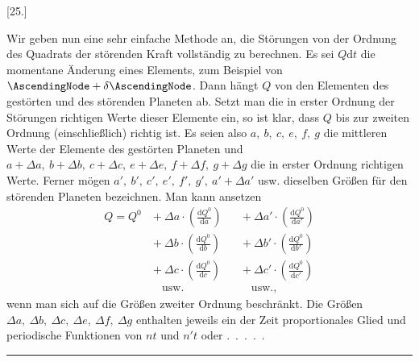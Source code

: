 \par{}\bigskip
{}
\begin{center}[25.]\end{center}
\begingroup
\noindent\hspace*{\parindent}Wir geben nun eine sehr einfache Methode an, die Störungen von der Ordnung des Quadrats der störenden Kraft vollständig zu berechnen. Es sei \(Q\mathrm{d}t\) die momentane Änderung eines Elements, zum Beispiel von \(\AscendingNode+\delta\AscendingNode\). Dann hängt \(Q\) von den Elementen des gestörten und des störenden Planeten ab. Setzt man die in erster Ordnung der Störungen richtigen Werte dieser Elemente ein, so ist klar, dass \(Q\) bis zur zweiten Ordnung (einschließlich) richtig ist. Es seien also \(a,\ b,\ c,\ e,\ f,\ g\) die mittleren Werte der Elemente des gestörten Planeten und \(a+\Delta a,\ b+\Delta b,\ c+\Delta c,\ e+\Delta e,\ f+\Delta f,\ g+\Delta g\) die in erster Ordnung richtigen Werte. Ferner mögen \(a',\ b',\ c',\ e',\ f',\ g',\ a'+\Delta a'\) usw. dieselben Größen für den störenden Planeten bezeichnen. Man kann ansetzen
\[
\begin{alignedat}{2}
Q=Q^0&{}+\Delta a\cdot\left(\frac{\mathrm{d}Q^0}{\mathrm{d}a}\right)&&{}+\Delta a'\cdot\left(\frac{\mathrm{d}Q^0}{\mathrm{d}a'}\right)\\[3pt]
&{}+\Delta b\cdot\left(\frac{\mathrm{d}Q^0}{\mathrm{d}b}\right)&&{}+\Delta b'\cdot\left(\frac{\mathrm{d}Q^0}{\mathrm{d}b'}\right)\\[3pt]
&{}+\Delta c\cdot\left(\frac{\mathrm{d}Q^0}{\mathrm{d}c}\right)&&{}+\Delta c'\cdot\left(\frac{\mathrm{d}Q^0}{\mathrm{d}c'}\right)\\[3pt]
&\quad\text{usw.}&&\quad\text{usw.,}
\end{alignedat}
\]
\noindent wenn man sich auf die Größen zweiter Ordnung beschränkt. Die Größen \(\Delta a,\allowbreak\ \Delta b,\allowbreak\ \Delta c,\allowbreak\ \Delta e,\allowbreak\ \Delta f,\allowbreak\ \Delta g\) enthalten jeweils ein der Zeit proportionales Glied und periodische Funktionen von \(nt\) und \(n't\) oder .\ .\ .\ .\ .
\par\medskip\begin{center}\rule{.18\linewidth}{.3pt}\end{center}
\endgroup
